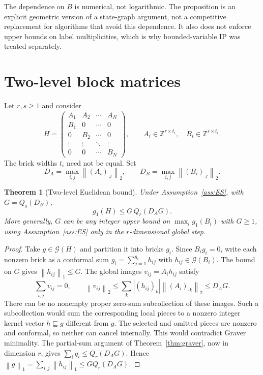 \documentclass[11pt]{article}
\newtheorem{theorem}{Theorem}[section]
\theoremstyle{definition}
\theoremstyle{remark}
\newcommand{\Z}{\mathbb Z}
\newcommand{\G}{\mathcal G}
\newcommand{\norm}[1]{\left\lVert #1\right\rVert}
\begin{document}
The dependence on $B$ is numerical, not logarithmic. The proposition is
an explicit geometric version of a state-graph argument, not a competitive
replacement for algorithms that avoid this dependence. It also does not
enforce upper bounds on label multiplicities, which is why bounded-variable
IP was treated separately.

\section{Two-level block matrices}\label{sec:block}

Let $r,s\ge1$ and consider
\[
 H=\begin{pmatrix}
 A_1&A_2&\cdots&A_N\\
 B_1&0&\cdots&0\\
 0&B_2&\cdots&0\\
 \vdots&\vdots&\ddots&\vdots\\
 0&0&\cdots&B_N
 \end{pmatrix},
 \qquad A_i\in\Z^{r\times t_i},\quad B_i\in\Z^{s\times t_i}.
\]
The brick widths $t_i$ need not be equal. Set
\[
 D_A=\max_{i,j}\norm{(A_i)_{\cdot j}}_2,
 \qquad D_B=\max_{i,j}\norm{(B_i)_{\cdot j}}_2.
\]

\begin{theorem}[Two-level Euclidean bound]\label{thm:block}
Under Assumption~\ref{ass:ES}, with $G=Q_s(D_B)$,
\[
 g_1(H)\le G\,Q_r(D_A G).
 \tag{9}\label{eq:block}
\]
More generally, $G$ can be any integer upper bound on
$\max_i g_1(B_i)$ with $G\ge1$, using Assumption~\ref{ass:ES} only in
the $r$-dimensional global step.
\end{theorem}
\begin{proof}
Take $g\in\G(H)$ and partition it into bricks $g_i$. Since $B_i g_i=0$,
write each nonzero brick as a conformal sum
$g_i=\sum_{j=1}^{q_i}h_{ij}$ with $h_{ij}\in\G(B_i)$.
The bound on $G$ gives $\norm{h_{ij}}_1\le G$.
The global images $v_{ij}=A_i h_{ij}$ satisfy
\[
 \sum_{i,j}v_{ij}=0,\qquad
 \norm{v_{ij}}_2\le\sum_k |(h_{ij})_k|\norm{(A_i)_{\cdot k}}_2
 \le D_A G.
\]
There can be no nonempty proper zero-sum subcollection of these images.
Such a subcollection would sum the corresponding local pieces to a
nonzero integer kernel vector $h\sqsubseteq g$ different from $g$.
The selected and omitted pieces are nonzero and conformal, so neither
can cancel internally. This would contradict Graver minimality.
The partial-sum argument of Theorem~\ref{thm:graver}, now in dimension
$r$, gives $\sum_i q_i\le Q_r(D_A G)$. Hence
$\norm g_1=\sum_{i,j}\norm{h_{ij}}_1\le GQ_r(D_A G)$.
\end{proof}
\end{document}
